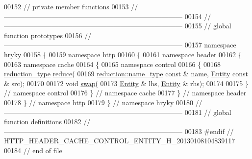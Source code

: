 \begin{DoxyCode}
00152 \textcolor{comment}{// private member functions}
00153 \textcolor{comment}{//
      ------------------------------------------------------------------------------}
00154 \textcolor{comment}{//
      ------------------------------------------------------------------------------}
00155 \textcolor{comment}{// global function prototypes}
00156 \textcolor{comment}{//
      ------------------------------------------------------------------------------}
00157 \textcolor{keyword}{namespace }hryky
00158 \{
00159 \textcolor{keyword}{namespace }http
00160 \{
00161 \textcolor{keyword}{namespace }header
00162 \{
00163 \textcolor{keyword}{namespace }cache
00164 \{
00165 \textcolor{keyword}{namespace }control
00166 \{
00168     \hyperlink{classhryky_1_1_intrusive_ptr}{reduction_type} \hyperlink{namespacehryky_1_1http_a08fc36a78a8e2908140fcd102829a566}{reduce}(
00169         \hyperlink{classhryky_1_1reduction_1_1_string}{reduction::name_type} \textcolor{keyword}{const} & name, \hyperlink{classhryky_1_1http_1_1header_1_1cache_1_1control_1_1_entity}{Entity} \textcolor{keyword}{const} & src);
00170 
00172     \textcolor{keywordtype}{void} \hyperlink{namespacehryky_1_1http_a38e62595ad532d18fbc65ceb61973aec}{swap}(
00173         \hyperlink{classhryky_1_1http_1_1header_1_1cache_1_1control_1_1_entity}{Entity} & lhs, \hyperlink{classhryky_1_1http_1_1header_1_1cache_1_1control_1_1_entity}{Entity} & rhs);
00174 
00175 \} \textcolor{comment}{// namespace control}
00176 \} \textcolor{comment}{// namespace cache}
00177 \} \textcolor{comment}{// namespace header}
00178 \} \textcolor{comment}{// namespace http}
00179 \} \textcolor{comment}{// namespace hryky}
00180 \textcolor{comment}{//
      ------------------------------------------------------------------------------}
00181 \textcolor{comment}{// global function definitions}
00182 \textcolor{comment}{//
      ------------------------------------------------------------------------------}
00183 \textcolor{preprocessor}{#endif // HTTP\_HEADER\_CACHE\_CONTROL\_ENTITY\_H\_20130108104839117}
00184 \textcolor{preprocessor}{}\textcolor{comment}{// end of file}
\end{DoxyCode}
